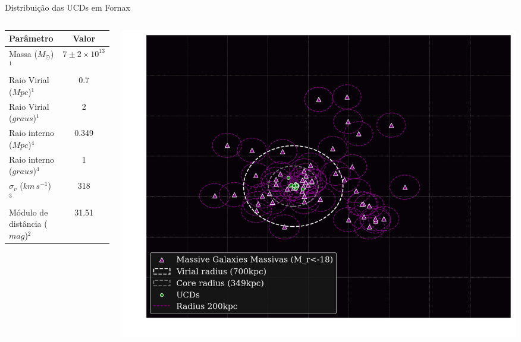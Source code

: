 \begin{frame}[c]{Distribuição das UCDs em Fornax}
    \begin{columns}[c]
        \begin{column}{0.48\textwidth}
            \centering
            \begin{table}[!ht]
                \centering
                \footnotesize
                \begin{tabular}{lc}
                    \toprule
                    \textbf{Parâmetro} & \textbf{Valor} \\ 
                    \midrule
                    Massa ($M_\odot$)$^1$ & $7 \pm 2 \times 10^{13}$ \\ 
                    Raio Virial ($Mpc$)$^1$ & 0.7 \\ 
                    Raio Virial ($graus$)$^1$ & 2 \\ 
                    Raio interno ($Mpc$)$^4$ & 0.349 \\ 
                    Raio interno ($graus$)$^4$ & 1 \\ 
                    $\sigma_v$ ($km \, s^{-1}$)$^3$ & 318 \\ 
                    Módulo de distância ($mag$)$^2$ & 31.51 \\ 
                    \bottomrule
                \end{tabular}
            \end{table}
        \end{column}
        \begin{column}{0.48\textwidth}
            \centering
            \includegraphics[width=\textwidth, height=0.48\textheight, keepaspectratio]{images/distribuicao_galaxias_massivas.png}

\end{column}
\end{columns}
\end{frame}
